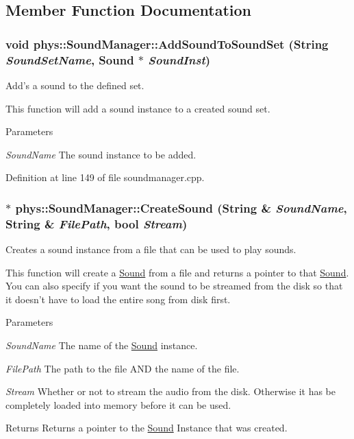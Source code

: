 \subsection{Member Function Documentation}
\hypertarget{classphys_1_1SoundManager_a89c05a5628e187939ea30b0e4b149931}{
\subsubsection[{AddSoundToSoundSet}]{\setlength{\rightskip}{0pt plus 5cm}void phys::SoundManager::AddSoundToSoundSet ({\bf String} {\em SoundSetName}, \/  {\bf Sound} $\ast$ {\em SoundInst})}}
\label{d1/dc4/classphys_1_1SoundManager_a89c05a5628e187939ea30b0e4b149931}


Add's a sound to the defined set. 

This function will add a sound instance to a created sound set. 
\begin{DoxyParams}{Parameters}
\item[{\em SoundName}]The sound instance to be added. \end{DoxyParams}


Definition at line 149 of file soundmanager.cpp.

\hypertarget{classphys_1_1SoundManager_ac9e68fef909b72110e9b68ff2674bcbb}{
\subsubsection[{CreateSound}]{ $\ast$ phys::SoundManager::CreateSound ({\bf String} \& {\em SoundName}, \/  {\bf String} \& {\em FilePath}, \/  bool {\em Stream})}}
\label{d1/dc4/classphys_1_1SoundManager_ac9e68fef909b72110e9b68ff2674bcbb}


Creates a sound instance from a file that can be used to play sounds. 

This function will create a \hyperlink{classphys_1_1Sound}{Sound} from a file and returns a pointer to that \hyperlink{classphys_1_1Sound}{Sound}. You can also specify if you want the sound to be streamed from the disk so that it doesn't have to load the entire song from disk first. 
\begin{DoxyParams}{Parameters}
\item[{\em SoundName}]The name of the \hyperlink{classphys_1_1Sound}{Sound} instance. \item[{\em FilePath}]The path to the file AND the name of the file. \item[{\em Stream}]Whether or not to stream the audio from the disk. Otherwise it has be completely loaded into memory before it can be used. \end{DoxyParams}
\begin{DoxyReturn}{Returns}
Returns a pointer to the \hyperlink{classphys_1_1Sound}{Sound} Instance that was created. 
\end{DoxyReturn}


